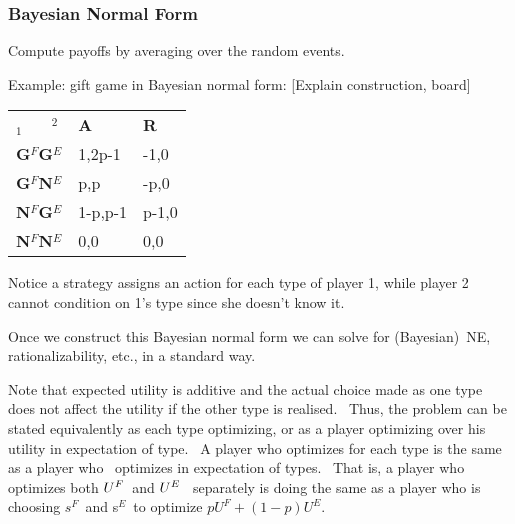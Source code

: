 \documentclass[handout]{beamer}
\begin{document}
\begin{frame}%

\frametitle{\textbf{Bayesian Normal Form}}

Compute payoffs by averaging over the random events. \ 

\bigskip 
\pause%

Example: gift game in Bayesian normal form: {\footnotesize [Explain
construction, board]}

\bigskip 

\begin{tabular}{lll}
$_{1}$ \ \ \ $^{2}$ & \textbf{A} & \textbf{R} \\ 
\textbf{G}$^{F}$\textbf{G}$^{E}$ & 1,2p-1 & -1,0 \\ 
\textbf{G}$^{F}$\textbf{N}$^{E}$ & p,p & -p,0 \\ 
\textbf{N}$^{F}$\textbf{G}$^{E}$ & 1-p,p-1 & p-1,0 \\ 
\textbf{N}$^{F}$\textbf{N}$^{E}$ & 0,0 & 0,0%
\end{tabular}%
\bigskip 

\end{frame}%

\begin{frame}%

{\footnotesize Notice a strategy assigns an action for each type of player
1, while player 2 cannot condition on 1's type since she doesn't know
it.\bigskip }

{\footnotesize Once we construct this Bayesian normal form we can solve for
(Bayesian)\ NE, rationalizability, etc., in a standard way.\bigskip }

\pause%
{\footnotesize Note that expected utility is additive and the actual choice
made as one type does not affect the utility if the other type is realised.
\ Thus, the problem can be stated equivalently as each type optimizing, or
as a player optimizing over his utility in expectation of type. \ A player
who optimizes for each type is the same as a player who \ optimizes in
expectation of types. \ That is, a player who optimizes both }$%
{\footnotesize U}^{F}${\footnotesize \ and }${\footnotesize U}^{E}$%
{\footnotesize \ separately is doing the same as a player who is choosing }$%
s^{F}${\footnotesize \ and s}$^{E}${\footnotesize \ to optimize }$%
pU^{F}+(1-p)U^{E}$.

\end{frame}%
\end{document}
